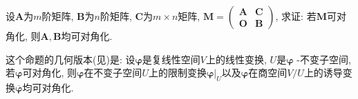 \documentclass[../../main.tex]{subfiles}
\begin{document}
\begin{proposition}\label{proposition:没有公共的特征值的可对角化矩阵的分块也可对角化 逆命题}
设\(\boldsymbol{A}\)为\(m\)阶矩阵, \(\boldsymbol{B}\)为\(n\)阶矩阵, \(\boldsymbol{C}\)为\(m\times n\)矩阵, \(\boldsymbol{M} = \begin{pmatrix}
\boldsymbol{A}&\boldsymbol{C}\\
\boldsymbol{O}&\boldsymbol{B}
\end{pmatrix}\), 求证: 若\(\boldsymbol{M}\)可对角化, 则\(\boldsymbol{A},\boldsymbol{B}\)均可对角化.
\end{proposition}
\begin{remark}
这个命题的几何版本(见)是: 设\(\boldsymbol{\varphi}\)是复线性空间\(V\)上的线性变换, \(U\)是\(\boldsymbol{\varphi}\) -不变子空间, 若\(\boldsymbol{\varphi}\)可对角化, 则\(\boldsymbol{\varphi}\)在不变子空间\(U\)上的限制变换\(\boldsymbol{\varphi}|_U\)以及\(\boldsymbol{\varphi}\)在商空间\(V/U\)上的诱导变换\(\overline{\boldsymbol{\varphi}}\)均可对角化. 
\end{remark}
\end{document}
